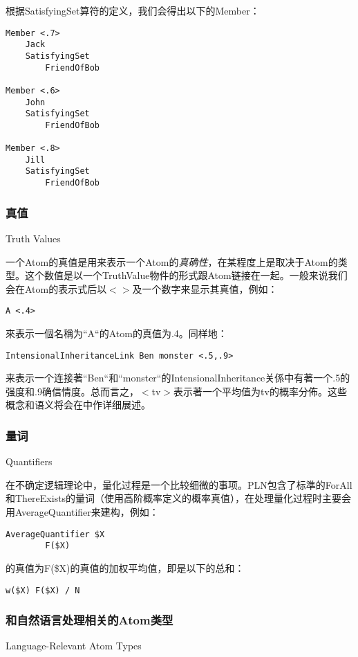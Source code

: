 根据SatisfyingSet算符的定义，我们会得出以下的Member：

\begin{verbatim}
Member <.7>
	Jack
	SatisfyingSet
		FriendOfBob

Member <.6>
	John
	SatisfyingSet
		FriendOfBob

Member <.8>
	Jill
	SatisfyingSet
		FriendOfBob
\end{verbatim}

\subsubsection{真值}{Truth Values}
\label{真值}

一个Atom的真值是用来表示一个Atom的\textit{真确性}，在某程度上是取决于Atom的类型。这个数值是以一个TruthValue物件的形式跟Atom链接在一起。一般来说我们会在Atom的表示式后以\ensuremath{<}\ensuremath{>}及一个数字来显示其真值，例如：

\begin{verbatim}
A <.4>
\end{verbatim}

來表示一個名稱为“A“的Atom的真值为.4。同样地：

\begin{verbatim}
IntensionalInheritanceLink Ben monster <.5,.9>
\end{verbatim}

\noindent 来表示一个连接著“Ben“和“monster“的IntensionalInheritance关係中有著一个.5的强度和.9确信情度。总而言之，\ensuremath{<}tv\ensuremath{>}表示著一个平均值为tv的概率分佈。这些概念和语义将会在\cite{PLN}中作详细展述。

\subsubsection{量词}{Quantiﬁers}

在不确定逻辑理论中，量化过程是一个比较细微的事项。PLN包含了标準的ForAll和ThereExists的量词（使用高阶概率定义的概率真值），在处理量化过程时主要会用AverageQuantifier来建构，例如：

\begin{verbatim}
AverageQuantifier $X
        F($X)
\end{verbatim}

的真值为F(\$X)的真值的加权平均值，即是以下的总和：

\begin{verbatim}
w($X) F($X) / N
\end{verbatim}

\subsubsection{和自然语言处理相关的Atom类型}{Language-Relevant Atom Types}

